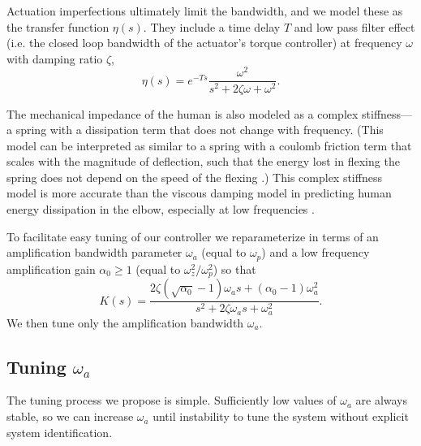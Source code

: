 \documentclass[utf8]{frontiersSCNS}
\renewcommand*{\cite}[1]{\citep{#1}}
\newcommand{\add}[1]{\textcolor[HTML]{8710b3}{#1}}
\begin{document}
Actuation imperfections ultimately limit the bandwidth, and we model these as the transfer function $\eta(s)$. They include a time delay $T$ and low pass filter effect (i.e. the closed loop bandwidth of the actuator's torque controller) at frequency $\omega$ with damping ratio $\zeta$,
\begin{equation}
\eta(s) = e^{-Ts} \frac{\omega^2}{s^2+2\zeta\omega + \omega^2}.
\end{equation}

The mechanical impedance of the human is also modeled as a complex stiffness---a spring with a dissipation term that does not change with frequency. (This model can be interpreted as similar to a spring with a coulomb friction term that scales with the magnitude of deflection, such that the energy lost in flexing the spring does not depend on the speed of the flexing \cite{BrissonneauHeThomasSentis2021CSL}.) This complex stiffness model is more accurate than the viscous damping model in predicting human energy dissipation in the elbow, especially at low frequencies  \cite{HeHuangThomasSentis2020TNSRE}.

To facilitate easy tuning of our controller we \add{reparameterize} in terms of an amplification bandwidth parameter $\omega_a$ (equal to $\omega_p$) and a low frequency amplification gain $\alpha_0\geq1$ (equal to $\omega_z^2/\omega_p^2$) so that
\begin{equation}
K(s) = \frac{2\zeta (\sqrt{\alpha_0}-1)\omega_a s + (\alpha_0-1)\omega_a^2}{s^2 + 2\zeta \omega_a s + \omega_a^2}.
\end{equation}
We then tune only the amplification bandwidth $\omega_a$.


\subsection{Tuning $\omega_a$}
The tuning process we propose is simple. Sufficiently low values of $\omega_a$ are always stable, so we can increase $\omega_a$ until instability to tune the system without explicit system identification.
\end{document}
